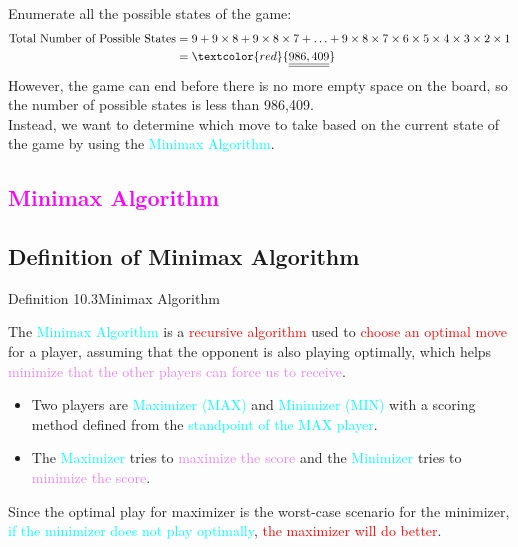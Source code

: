 \documentclass{book}
\begin{document}
Enumerate all the possible states of the game:
\begin{align*}
    \text{Total Number of Possible States} &= 9 + 9 \times 8 + 9 \times 8 \times 7 + \ldots + 9 \times 8 \times 7 \times 6 \times 5 \times 4 \times 3 \times 2 \times 1\\
    &= \textcolor{red}{\underline{\underline{986,409}}}
\end{align*}
However, the game can end before there is no more empty space on the board, so the number of possible states is less than 986,409.\\
Instead, we want to determine which move to take based on the current state of the game by using the \textcolor{cyan}{Minimax Algorithm}.\\
\newpage
\textcolor{magenta}{\section{\textbf{Minimax Algorithm}}}
\subsection{Definition of Minimax Algorithm}
\begin{defBox}{Definition 10.3}{Minimax Algorithm}
    \raggedright
    The \textcolor{cyan}{Minimax Algorithm} is a \textcolor{red}{recursive algorithm} used to \textcolor{red}{choose an optimal move} for a player, assuming that the opponent is also playing optimally, which helps \textcolor{violet}{minimize that the other players can force us to receive}.\\
    \begin{itemize}
        \item Two players are \textcolor{cyan}{Maximizer (MAX)} and \textcolor{cyan}{Minimizer (MIN)} with a scoring method defined from the \textcolor{cyan}{standpoint of the MAX player}.
        \item The \textcolor{cyan}{Maximizer} tries to \textcolor{violet}{maximize the score} and the \textcolor{cyan}{Minimizer} tries to \textcolor{violet}{minimize the score}.
    \end{itemize}
\end{defBox}
Since the optimal play for maximizer is the worst-case scenario for the minimizer, \textcolor{cyan}{if the minimizer does not play optimally}, \textcolor{red}{the maximizer will do better}.\\
\end{document}
